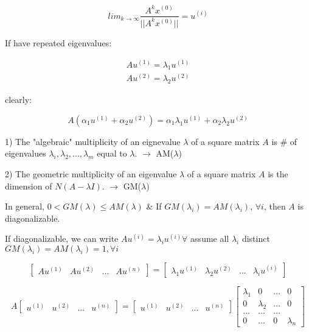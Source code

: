 \begin{equation*}
lim_{k\rightarrow \infty}\frac{A^kx^{(0)}}{||A^kx^{(0)}||} =u^{(i)}
\end{equation*}


If have repeated eigenvalues:

\begin{align*}
Au^{(1)} =\lambda_1u^{(1)}\\
Au^{(2)} =\lambda_2u^{(2)}
\end{align*}

clearly:

\begin{equation*}
A(\alpha_1u^{(1)} + \alpha_2u^{(2)}) = \alpha_1\lambda_1u^{(1)} + \alpha_2\lambda_2u^{(2)}
\end{equation*}

1) The "algebraic" multiplicity of an eignevalue $\lambda$ of a square matrix $A$ is \# of eigenvalues $\lambda_i, \lambda_2,...,\lambda_m$ equal to $\lambda$. $\rightarrow$ AM($\lambda$)

2) The geometric multiplicity of an eigenvalue $\lambda$ of a square matrix $A$ is the dimension of $N(A - \lambda I)$. $\rightarrow$ GM($\lambda$)

In general, $0 < GM(\lambda) \leq AM(\lambda)$ \& If $GM(\lambda_i) = AM(\lambda_i)$, $\forall i$, then $A$ is diagonalizable. 


If diagonalizable, we can write $Au^{(i)} = \lambda_iu^{(i)} \forall$ assume all $\lambda_i$ distinct $GM(\lambda_i) = AM(\lambda_i) = 1, \forall i$

$$
\left[
\begin{matrix}
Au^{(1)} & Au^{(2)} &... &Au^{(n)} 
\end{matrix}
\right] =
\left[
\begin{matrix}
\lambda_1u^{(1)} & \lambda_2u^{(2)}&... &\lambda_iu^{(i)}
\end{matrix}
\right]
$$

$$A
\left[
\begin{matrix}
u^{(1)} & u^{(2)} &... &u^{(n)} 
\end{matrix}
\right] =
\left[
\begin{matrix}
u^{(1)} & u^{(2)} &... &u^{(n)}
\end{matrix}
\right]
\left[
\begin{matrix}
\lambda_1 & 0 & ... & 0\\
0& \lambda_2  &  ... & 0\\
...  & ...  &   ...& \\
0    &  ... &  0 & \lambda_n
\end{matrix}
\right]
$$



